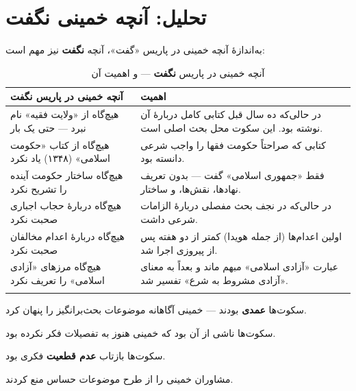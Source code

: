 \documentclass[12pt,a4paper]{book}
\newcommand{\keyword}[1]{\textbf{\textcolor{cPrimary}{#1}}}
\begin{document}
\section{تحلیل: آنچه خمینی \keyword{نگفت}}

به‌اندازهٔ آنچه خمینی در پاریس «گفت»، آنچه \keyword{نگفت} نیز مهم است:

\begin{longtable}{%
    >{\raggedleft\arraybackslash}p{}
    >{\raggedleft\arraybackslash}p{}}
\toprule
\rowcolor{cAccent!10}
\textbf{آنچه خمینی در پاریس نگفت} & \textbf{اهمیت} \\
\midrule
\endhead

هیچ‌گاه از «ولایت فقیه» نام نبرد — حتی یک بار &
در حالی‌که ده سال قبل کتابی کامل دربارهٔ آن نوشته بود. این سکوت محل بحث اصلی است. \\
\midrule

هیچ‌گاه از کتاب «حکومت اسلامی» (۱۳۴۸) یاد نکرد &
کتابی که صراحتاً حکومت فقها را واجب شرعی دانسته بود. \\
\midrule

هیچ‌گاه ساختار حکومت آینده را تشریح نکرد &
فقط «جمهوری اسلامی» گفت — بدون تعریف نهادها، نقش‌ها، و ساختار. \\
\midrule

هیچ‌گاه دربارهٔ حجاب اجباری صحبت نکرد &
در حالی‌که در نجف بحث مفصلی دربارهٔ الزامات شرعی داشت. \\
\midrule

هیچ‌گاه دربارهٔ اعدام مخالفان صحبت نکرد &
اولین اعدام‌ها (از جمله هویدا) کمتر از دو هفته پس از پیروزی اجرا شد. \\
\midrule

هیچ‌گاه مرزهای «آزادی اسلامی» را تعریف نکرد &
عبارت «آزادی اسلامی» مبهم ماند و بعداً به معنای «آزادی مشروط به شرع» تفسیر شد. \\

\bottomrule
\caption{آنچه خمینی در پاریس \textbf{نگفت} — و اهمیت آن}
\label{tab:paris-silences}
\end{longtable}

\begin{warningBox}
\begin{description}[style=nextline, font=\bfseries\color{cPrimary}]
    \item[تز ۲ (خدعه):] سکوت‌ها \keyword{عمدی} بودند — خمینی آگاهانه موضوعات بحث‌برانگیز را پنهان کرد.
    \item[تز ۱ (صداقت):] سکوت‌ها ناشی از آن بود که خمینی هنوز به تفصیلات فکر نکرده بود.
    \item[تز ۳ (تکامل):] سکوت‌ها بازتاب \keyword{عدم قطعیت} فکری بود.
    \item[تز ۴ (نخبگان):] مشاوران خمینی را از طرح موضوعات حساس منع کردند.
\end{description}
\end{warningBox}
\end{document}
